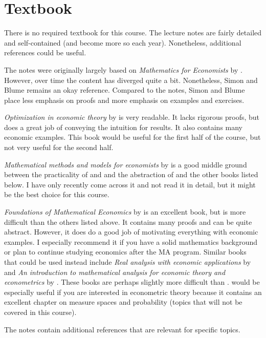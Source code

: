 \documentclass[10pt]{article}
\renewcommand{\cite}{\citet}
\begin{document}
\section{Textbook}

There is no required textbook for this course. The lecture notes are
fairly detailed and self-contained (and become more so each
year). Nonetheless, additional references could be useful.

The notes were originally largely based on \textit{Mathematics for
  Economists} by \cite{sb1994}. However, over time the content has
diverged quite a bit. Nonetheless, Simon and Blume remains an okay
reference. Compared to the notes, Simon and Blume place less emphasis
on proofs and more emphasis on examples and exercises.

\textit{Optimization in economic theory} by \cite{dixit1990} is very
readable. It lacks rigorous proofs, but does a great job of conveying
the intuition for results. It also contains many economic
examples. This book would be useful for the first half of the course,
but not very useful for the second half.

\textit{Mathematical methods and models for economists} by
\cite{fuente2000} is a good middle ground between the practicality of
\cite{dixit1990} and \cite{sb1994} and the abstraction of
\cite{carter2001} and the other books listed below. I have only
recently come across it and not read it in detail, but it might be the
best choice for this course.

\textit{Foundations of Mathematical Economics} by \cite{carter2001} is
an excellent book, but is more difficult than the others listed
above. It contains many proofs and can be quite abstract. However, it
does do a good job of motivating everything with economic examples. I
especially recommend it if you have a solid mathematics background or
plan to continue studying economics after the MA program. Similar
books that could be used instead include \textit{Real analysis with
  economic applications} by \cite{ok2007} and \textit{An introduction
  to mathematical analysis for economic theory and econometrics} by
\cite{corbae2009}. These books are perhaps slightly more difficult
than \cite{carter2001}. \cite{corbae2009} would be especially useful
if you are interested in econometric theory because it contains an
excellent chapter on measure spaces and probability (topics that will
not be covered in this course).
 
The notes contain additional references that are relevant for specific
topics.
\end{document}
